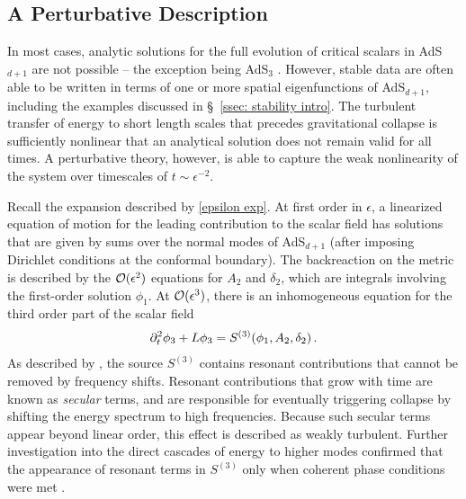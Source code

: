 \documentclass[../PhD.tex]{subfiles}
\begin{document}
\subsection{A Perturbative Description}
\label{ssec: perturbative}

In most cases, analytic solutions for the full evolution of critical scalars in AdS$_{d+1}$ are not possible -- the exception being AdS$_3$ \cite{gr-qc/0205107, gr-qc/0008023, 1309.1629, 1401.4093}. However, stable data are often able to be written in terms of one or more spatial eigenfunctions of AdS$_{d+1}$, including the examples discussed in \S\!~\ref{ssec: stability intro}. The turbulent transfer of energy to short length scales that precedes gravitational collapse is sufficiently nonlinear that an analytical solution does not remain valid for all times. A perturbative theory, however, is able to capture the weak nonlinearity of the system over timescales of $t \sim \epsilon^{-2}$. 

Recall the expansion described by \eqref{epsilon exp}. At first order in $\epsilon$, a linearized equation of motion for the leading contribution to the scalar field has solutions that are given by sums over the normal modes of AdS$_{d+1}$ (after imposing Dirichlet conditions at the conformal boundary). The backreaction on the metric is described by the $\mathcal O(\epsilon^2)$ equations for $A_2$ and $\delta_2$, which are integrals involving the first-order solution $\phi_1$. At $\mathcal O(\epsilon^3)$, there is an inhomogeneous equation for the third order part of the scalar field
\begin{align}
\partial_t^2 \phi_3 + L \phi_3 = S^{(3)}(\phi_1, A_2, \delta_2) \, .
\end{align}
As described by \cite{1104.3702}, the source $S^{(3)}$ contains resonant contributions that cannot be removed by frequency shifts. Resonant contributions that grow with time are known as \emph{secular} terms, and are responsible for eventually triggering collapse by shifting the energy spectrum to high frequencies. Because such secular terms appear beyond linear order, this effect is described as weakly turbulent. Further investigation into the direct cascades of energy to higher modes confirmed that the appearance of resonant terms in $S^{(3)}$ only when coherent phase conditions were met \cite{1512.04383, 1512.00349, 1509.00232}.
\end{document}
